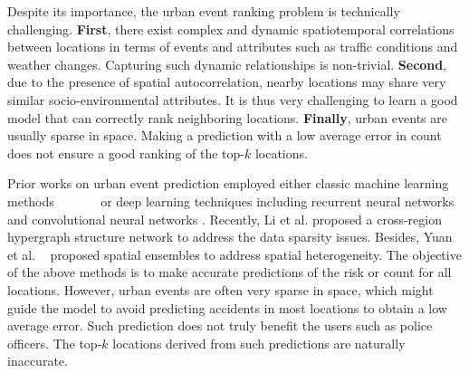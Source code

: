 \documentclass{article}
\begin{document}
Despite its importance, the urban event ranking problem is technically challenging. \textbf{First}, there exist complex and dynamic spatiotemporal correlations between locations in terms of events and attributes such as traffic conditions and weather changes. Capturing such dynamic relationships is non-trivial. \textbf{Second}, due to the presence of spatial autocorrelation, nearby locations may share very similar socio-environmental attributes. It is thus very challenging to learn a good model that can correctly rank neighboring locations. \textbf{Finally}, urban events are usually sparse in space. Making a prediction with a low average error in count does not ensure a good ranking of the top-$k$ locations.

Prior works on urban event prediction employed either classic machine learning methods \cite{DONG2015192}~\cite{abellan2013analysis}~\cite{bergel2013explaining}~\cite{CALIENDO2007657}~\cite{chang2005analysis}~\cite{chang2005data}~\cite{KhezerlouAmin2017ATFA}
or deep learning techniques including recurrent neural networks \cite{Ren2018ADL} and convolutional neural networks \cite{najjar2017combining}\cite{VahedianAmin2019PUDE}. %
Recently, Li et al. \cite{LiZhonghang2022SHSL} proposed a cross-region hypergraph structure network to address the data sparsity issues. Besides, Yuan et al. \cite{yuan2018hetero}~\cite{doi:10.1137/1.9781611977172.38} proposed spatial ensembles to address spatial heterogeneity. %
The objective of the above methods is to make accurate predictions of the risk or count for all locations. However, urban events are often very sparse in space, which might guide the model to avoid predicting accidents in most locations to obtain a low average error. Such prediction does not truly benefit the users such as police officers. The top-$k$ locations derived from such predictions are naturally inaccurate. 
\end{document}

